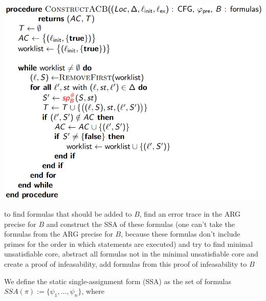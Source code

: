 \documentclass[a4paper]{article}
\begin{document}
\begin{minipage}[t]{0.16\linewidth}
\begin{betterlist}
{{\begin{betterlist}
					\includegraphics[width=0.7\linewidth]{./figures/ConstructACB.png}
					\item to find formulas that should be added to $B$, find an error trace in the ARG precise for $B$ and construct the SSA of these formulas (one can't take the formulas from the ARG precise for $B$, because these formulas don't include primes for the order in which statements are executed) and try to find minimal unsatisfiable core, abstract all formulas not in the minimal unsatisfiable core and create a proof of infeasability, add formulas from this proof of infeasability to $B$
					\begin{betterlist}
						\item We define the \alert{static single-assignment form (SSA)} as the set of formulas $SSA(\pi) := \{\psi_1, \ldots, \psi_n\}$, where


\end{betterlist}
\end{betterlist}}}
\end{betterlist}
\end{minipage}
\end{document}
